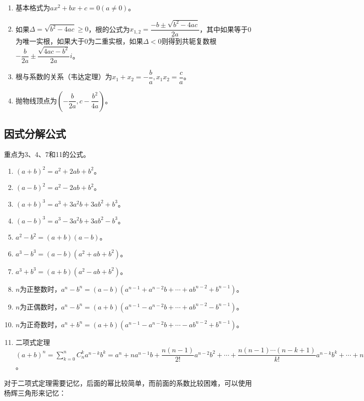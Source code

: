 \documentclass[UTF8, 12pt]{ctexart}
\begin{document}
\begin{enumerate}
    \item 基本格式为$ax^2+bx+c=0(a\neq 0)$。
    \item 如果$\Delta=\sqrt{b^2-4ac}\geqslant 0$，根的公式为$x_{1,2}=\dfrac{-b\pm\sqrt{b^2-4ac}}{2a}$，其中如果等于0为唯一实根，如果大于0为二重实根，如果$\Delta<0$则得到共轭复数根$-\dfrac{b}{2a}\pm\dfrac{\sqrt{4ac-b^2}}{2a}i$。
    \item 根与系数的关系（韦达定理）为$x_1+x_2=-\dfrac{b}{a},x_1x_2=\dfrac{c}{a}$。
    \item 抛物线顶点为$(-\dfrac{b}{2a},c-\dfrac{b^2}{4a})$。
\end{enumerate}

\subsection{因式分解公式}

重点为3、4、7和11的公式。

\begin{enumerate}
    \item $(a+b)^2=a^2+2ab+b^2$。
    \item $(a-b)^2=a^2-2ab+b^2$。
    \item $(a+b)^3=a^3+3a^2b+3ab^2+b^3$。
    \item $(a-b)^3=a^3-3a^2b+3ab^2-b^3$。
    \item $a^2-b^2=(a+b)(a-b)$。
    \item $a^3-b^3=(a-b)(a^2+ab+b^2)$。
    \item $a^3+b^3=(a+b)(a^2-ab+b^2)$。
    \item $n$为正整数时，$a^n-b^n=(a-b)(a^{n-1}+a^{n-2}b+\cdots+ab^{n-2}+b^{n-1})$。
    \item $n$为正偶数时，$a^n-b^n=(a+b)(a^{n-1}-a^{n-2}b+\cdots+ab^{n-2}-b^{n-1})$。
    \item $n$为正奇数时，$a^n+b^n=(a+b)(a^{n-1}-a^{n-2}b+\cdots-ab^{n-2}+b^{n-1})$。
    \item 二项式定理$(a+b)^n=\sum_{k=0}^nC_n^ka^{n-k}b^k=a^n+na^{n-1}b+\dfrac{n(n-1)}{2!}a^{n-2}b^2+\cdots+\dfrac{n(n-1)\cdots(n-k+1)}{k!}a^{n-k}b^k+\cdots+nab^{n-1}+b^n$。
\end{enumerate}

对于二项式定理需要记忆，后面的幂比较简单，而前面的系数比较困难，可以使用杨辉三角形来记忆：
\end{document}
